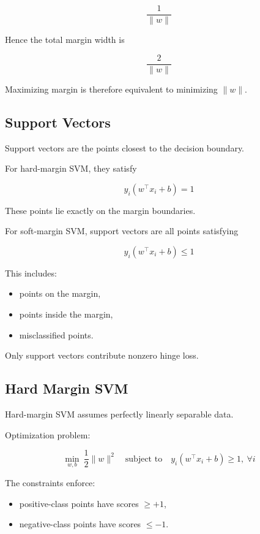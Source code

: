 \documentclass[10pt,a4paper]{article}
\begin{document}
		\[
		\frac{1}{\|w\|}
		\]
		
		Hence the total margin width is
		
		\[
		\frac{2}{\|w\|}
		\]
		
		Maximizing margin is therefore equivalent to minimizing $\|w\|$.
		
		\subsection{Support Vectors}
		
		Support vectors are the points closest to the decision boundary.
		
		For hard-margin SVM, they satisfy
		
		\[
		y_i(w^\top x_i+b)=1
		\]
		
		These points lie exactly on the margin boundaries.
		
		For soft-margin SVM, support vectors are all points satisfying
		
		\[
		y_i(w^\top x_i+b)\le1
		\]
		
		This includes:
		
		\begin{itemize}
		    \item points on the margin,
		    \item points inside the margin,
		    \item misclassified points.
		\end{itemize}
		
		Only support vectors contribute nonzero hinge loss.
		
		\subsection{Hard Margin SVM}
		
		Hard-margin SVM assumes perfectly linearly separable data.
		
		Optimization problem:
		
		\[
		\min_{w,b}\ \frac{1}{2}\|w\|^2
		\quad
		\text{subject to}
		\quad
		y_i(w^\top x_i+b)\ge1,\ \forall i
		\]
		
		The constraints enforce:
		
		\begin{itemize}
		    \item positive-class points have scores $\ge +1$,
		    \item negative-class points have scores $\le -1$.
		\end{itemize}
		
\end{document}

